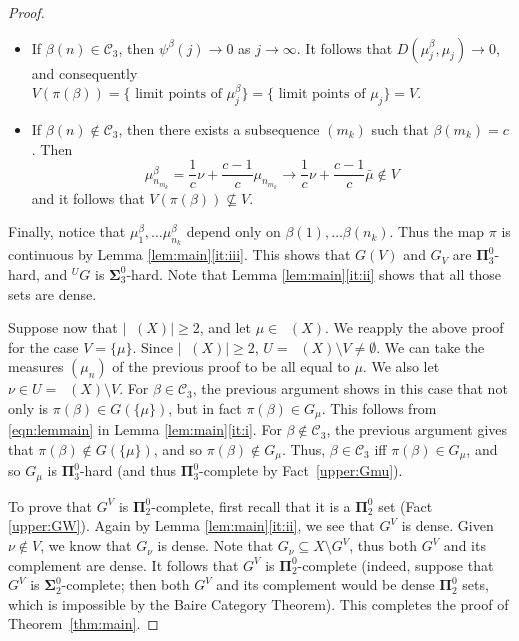\documentclass{amsart}
\theoremstyle{definition}
\newcommand{\bP}{\boldsymbol{\Pi}}
\newcommand{\bS}{\boldsymbol{\Sigma}}
\DeclareMathOperator{\MT}{\mathcal{M}_{\mathit T} }
\begin{document}
\begin{proof}
\begin{itemize}
  \item If $\beta(n) \in \mathcal{C}_3$, then $\psi^\beta(j) \to 0$ as $j \to \infty$. It follows that $D(\mu^\beta_j, \mu_j) \to 0$, and consequently $V(\pi(\beta)) = \{ \textrm{ limit points of } \mu^\beta_j \} = \{ \textrm{ limit points of } \mu_j \} = V$.
  \item If $\beta(n) \not \in \mathcal{C}_3$, then there exists a subsequence $(m_k)$ such that $\beta(m_k) = c$. Then
  \[
    \mu^\beta_{n_{m_k}} = \frac{1}{c} \nu + \frac{c-1}{c} \mu_{n_{m_k}} \to \frac{1}{c} \nu + \frac{c-1}{c} \bar{\mu}
    \not \in V
  \]
  and it follows that $V(\pi(\beta))  \not \subseteq V$.
\end{itemize}
Finally, notice that $\mu^\beta_1, \dots \mu^\beta_{n_k}$ depend only on $\beta(1), \dots \beta(n_k)$. Thus the map $\pi$ is continuous by  Lemma \ref{lem:main}\eqref{it:iii}. This shows that $G(V)$ and $G_V$ are $\bP^0_3$-hard, and $^U G$ is $\bS_3^0$-hard. Note that Lemma \ref{lem:main}\eqref{it:ii} shows that all those sets are dense.

Suppose now that $|\MT(X)|\geq 2$, and let $\mu \in \MT(X)$. We
reapply the above proof for the case $V=\{ \mu\}$. Since $|\MT(X)|\geq 2$,
$U=\MT(X)\setminus V \neq \emptyset$. We can take the measures
$(\mu_n)$ of the previous proof to be all equal to $\mu$.
We also let $\nu \in U=\MT(X)\setminus V$. For $\beta \in \mathcal{C}_3$,
the previous argument shows in this case that
not only is $\pi(\beta) \in G(\{ \mu\})$, but in fact
$\pi(\beta) \in G_\mu$. This follows from \eqref{eqn:lemmain} in Lemma \ref{lem:main}\eqref{it:i}. For $\beta \notin \mathcal{C}_3$, the previous argument
gives that $\pi(\beta) \notin G(\{\mu\})$, and so $\pi(\beta) \notin G_\mu$.
Thus, $\beta \in \mathcal{C}_3$ iff $\pi(\beta)\in G_\mu$, and so
$G_\mu$ is $\bP^0_3$-hard (and thus $\bP^0_3$-complete by Fact~\ref{upper:Gmu}).

To prove that $G^V$ is $\bP^0_2$-complete, first recall that it is a $\bP^0_2$ set (Fact \ref{upper:GW}). Again by Lemma \ref{lem:main}\eqref{it:ii}, we see that $G^V$ is dense. Given $\nu \notin V$, we know that $G_\nu$ is dense. Note that $G_\nu \subseteq X \setminus G^V$, thus both $G^V$ and its complement are dense. It follows that $G^V$ is $\bP^0_2$-complete (indeed, suppose that $G^V$ is $\bS^0_2$-complete; then both $G^V$ and its complement would be dense $\bP^0_2$ sets, which is impossible by the Baire Category Theorem).
This completes the proof of Theorem~\ref{thm:main}.
\end{proof}
\end{document}
